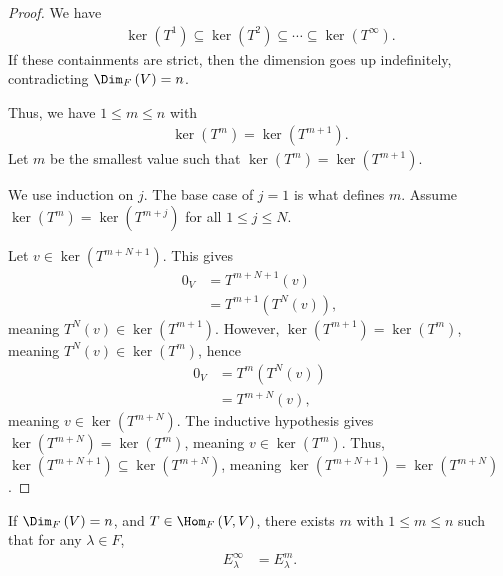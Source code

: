 \documentclass[10pt]{mypackage}
\begin{document}
\begin{proof}
  We have
  \begin{align*}
    \ker\left(T^{1}\right)\subseteq \ker\left(T^{2}\right)\subseteq \cdots \subseteq \ker\left(T^{\infty}\right).
  \end{align*}
  If these containments are strict, then the dimension goes up indefinitely, contradicting $\Dim_{F}\left(V\right) = n$.\newline

  Thus, we have $1 \leq m \leq n$ with
  \begin{align*}
    \ker\left(T^{m}\right) = \ker\left(T^{m+1}\right).
  \end{align*}
  Let $m$ be the smallest value such that $\ker\left(T^{m}\right) = \ker\left(T^{m+1}\right)$.\newline

  We use induction on $j$. The base case of $j = 1$ is what defines $m$. Assume $\ker\left(T^{m}\right) = \ker\left(T^{m+j}\right)$ for all $1 \leq j \leq N$.\newline

  Let $v\in \ker\left(T^{m+N+1}\right)$. This gives 
  \begin{align*}
    0_V &= T^{m+N+1}\left(v\right)\\
        &= T^{m+1}\left(T^{N}\left(v\right)\right),
  \end{align*}
  meaning $T^N(v)\in \ker\left(T^{m+1}\right)$. However, $\ker\left(T^{m+1}\right) = \ker\left(T^{m}\right)$, meaning $T^{N}\left(v\right) \in \ker\left(T^{m}\right)$, hence
  \begin{align*}
    0_V &= T^{m}\left(T^{N}(v)\right)\\
        &= T^{m+N}\left(v\right),
  \end{align*}
  meaning $v\in \ker\left(T^{m+N}\right)$. The inductive hypothesis gives $\ker\left(T^{m+N}\right) = \ker\left(T^{m}\right)$, meaning $v\in \ker\left(T^{m}\right)$. Thus, $\ker\left(T^{m+N+1}\right)\subseteq \ker\left(T^{m+N}\right)$, meaning $\ker\left(T^{m+N+1}\right) = \ker\left(T^{m+N}\right)$.
\end{proof}
\begin{corollary}
  If $\Dim_{F}\left(V\right) = n$, and $T\in \Hom_{F}\left(V,V\right)$, there exists $m$ with $1 \leq m \leq n$ such that for any $\lambda \in F$,
  \begin{align*}
    E_{\lambda}^{\infty} &= E_{\lambda}^{m}.
  \end{align*}
\end{corollary}
\end{document}
